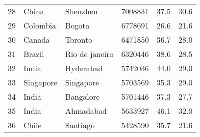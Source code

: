 \begin{center}
\begin{longtable}{clllcc}
        28                                       & China                                & Shenzhen                          & 7008831                                 & 37.5                                  & 30.6                                  \\
        29                                       & Colombia                             & Bogota                            & 6778691                                 & 26.6                                  & 21.6                                  \\
        30                                       & Canada                               & Toronto                           & 6471850                                 & 36.7                                  & 28.0                                  \\
        31                                       & Brazil                               & Rio de janeiro                    & 6320446                                 & 38.6                                  & 28.5                                  \\
        32                                       & India                                & Hyderabad                         & 5742036                                 & 44.0                                  & 29.0                                  \\
        33                                       & Singapore                            & Singapore                         & 5703569                                 & 35.3                                  & 29.0                                  \\
        34                                       & India                                & Bangalore                         & 5701446                                 & 37.3                                  & 27.7                                  \\
        35                                       & India                                & Ahmadabad                         & 5633927                                 & 46.1                                  & 32.0                                  \\
        36                                       & Chile                                & Santiago                          & 5428590                                 & 35.7                                  & 21.6                                  \\

\end{longtable}
\end{center}
